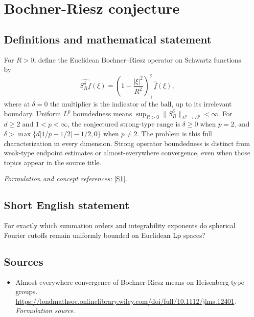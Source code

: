 \documentclass[11pt]{article}
\begin{document}
\section*{\texorpdfstring{Bochner-Riesz conjecture}{Bochner-Riesz conjecture}}\label{180}
\subsection{Definitions and mathematical statement}
For $R>0$, define the Euclidean Bochner--Riesz operator on Schwartz functions by
\[
 \widehat{S_R^\delta f}(\xi)=\left(1-\frac{|\xi|^2}{R^2}\right)_+^\delta\widehat f(\xi),
\]
where at $\delta=0$ the multiplier is the indicator of the ball, up to its irrelevant boundary. Uniform $L^p$ boundedness means
$\sup_{R>0}\|S_R^\delta\|_{L^p\to L^p}<\infty$.
For $d\ge2$ and $1<p<\infty$, the conjectured strong-type range is $\delta\ge0$ when $p=2$, and
$\delta>\max\{d|1/p-1/2|-1/2,0\}$ when $p\ne2$.
The problem is this full characterization in every dimension. Strong operator boundedness is distinct from weak-type endpoint estimates or almost-everywhere convergence, even when those topics appear in the source title.
\par\smallskip\textit{Formulation and concept references:} \href{https://londmathsoc.onlinelibrary.wiley.com/doi/full/10.1112/jlms.12401}{[S1]}.

\subsection{Short English statement}
For exactly which summation orders and integrability exponents do spherical Fourier cutoffs remain uniformly bounded on Euclidean Lp spaces?
\subsection{Sources}
\begin{itemize}
\item[S1]Almost everywhere convergence of Bochner-Riesz means on Heisenberg-type groups.
\url{https://londmathsoc.onlinelibrary.wiley.com/doi/full/10.1112/jlms.12401}.
\textit{Formulation source.}
\end{itemize}
\end{document}
